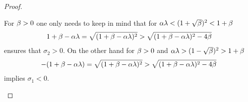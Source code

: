 \begin{proof}
\begin{description}[wide, labelindent=0pt]
		For \(\beta>0\) one only needs to keep in mind that for
		 \(\alpha\lambda < (1+\sqrt{\beta})^2 <1+\beta\)
		\begin{align*}
			1+\beta-\alpha\lambda = \sqrt{(1+\beta-\alpha\lambda)^2}
			> \sqrt{(1+\beta-\alpha\lambda)^2 - 4\beta}
		\end{align*}
		ensures that \(\sigma_2 >0\). On the other hand for \(\beta>0\)
		and \(\alpha\lambda > (1-\sqrt{\beta})^2> 1+\beta\)
		\begin{align*}
			- (1+\beta-\alpha\lambda) = \sqrt{(1+\beta-\alpha\lambda)^2}
			> \sqrt{(1+\beta-\alpha\lambda)^2 - 4\beta}
		\end{align*}
		implies \(\sigma_1 < 0\). \qedhere
 \end{description}
\end{proof}

